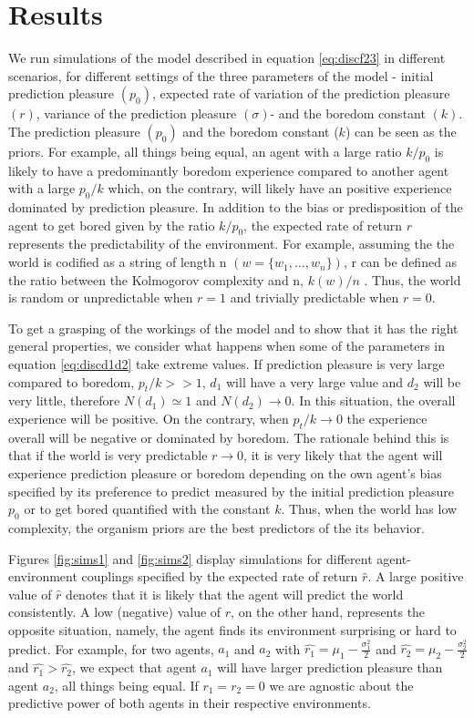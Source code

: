 \documentclass[11pt, onecolumn]{article}
\begin{document}
\section{Results}
\label{se:re}

We run simulations of the model described in equation \ref{eq:discf23} in different scenarios, for different settings of the three parameters of the model - initial prediction pleasure $(p_0)$, expected rate of variation of the prediction pleasure $(r)$, variance of the prediction pleasure $(\sigma)$- and the boredom constant $(k)$. The prediction pleasure $(p_0)$ and the boredom constant ($k$) can be seen as the priors. For example, all things being equal, an agent with a large ratio $k/p_0$ is likely to have a predominantly boredom experience compared to another agent with a large $p_0/k$ which, on the contrary, will likely have an positive experience dominated by prediction pleasure. In addition to the bias or predisposition of the agent to get bored given by the ratio $k/p_0$, the expected rate of return $r$ represents the predictability of the environment. For example, assuming the the world is codified as a string of length n $(w = \{w_1, ..., w_n \})$, r can be defined as the ratio between the Kolmogorov complexity and n, $k(w)/n$ . Thus, the world is random or unpredictable when $r =1$ and trivially predictable when $r =0$. 

To get a grasping of the workings of the model and to show that it has the right general properties, we consider what happens when some of the parameters in  equation \ref{eq:discd1d2} take extreme values. If prediction pleasure is very large compared to boredom, $p_t/k >> 1$, $d_1$ will have a very large value and $d_2$ will be very little, therefore $N(d_1) \simeq 1$ and $N(d_2) \to 0$. In this situation, the overall experience will be positive. On the contrary, when $p_t/k \to 0$ the experience overall will be negative or dominated by boredom. 
The rationale behind this is that if the world is very predictable  $r \to 0$, it is very likely that the agent will experience prediction pleasure or boredom depending on the own agent's bias specified by its preference to predict measured by the initial prediction pleasure $p_0$ or to get bored quantified with the constant $k$. Thus, when the world has low complexity, the organism priors are the best predictors of the its behavior. 

Figures \ref{fig:sims1} and \ref{fig:sims2} display simulations for different agent-environment couplings specified by the expected rate of return $\hat{r}$. A large positive value of $\hat{r}$ denotes that it is likely that the agent will predict the world consistently. A low (negative) value of $r$, on the other hand, represents the opposite situation, namely, the agent finds its environment surprising or hard to predict. 
For example, for two agents, $a_1$ and $a_2$ with $\hat{r_1} = \mu_1 - \frac{\sigma_1 ^2}{2}$ and $\hat{r_2} = \mu_2 - \frac{\sigma_2 ^2}{2}$ and $\hat{r_1} > \hat{r_2}$, we expect that agent $a_1$ will have larger prediction pleasure than agent $a_2$, all things being equal. If $r_1 =r_2 = 0$ we are agnostic about the predictive power of both agents in their respective environments. 
\end{document}
